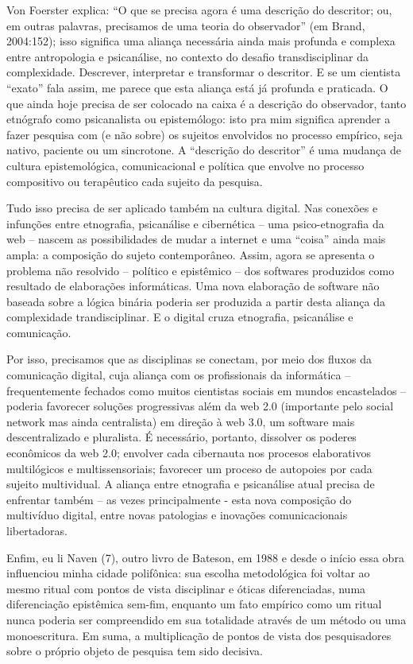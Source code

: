 \documentclass[a4paper, 12pt]{article} %
\begin{document}
Von Foerster explica: “O que se precisa agora é uma descrição do descritor; ou, em outras palavras, precisamos de uma teoria do observador” (em Brand, 2004:152); isso significa uma aliança necessária ainda mais profunda e complexa entre antropologia e psicanálise, no contexto do desafio  transdisciplinar da complexidade. Descrever, interpretar e transformar o descritor. E se um cientista “exato” fala assim, me parece que esta aliança está já profunda e praticada. O que ainda hoje precisa de ser colocado na caixa é a descrição do observador, tanto etnógrafo como psicanalista ou epistemólogo: isto pra mim significa aprender a fazer pesquisa com (e não sobre) os sujeitos envolvidos no processo empírico, seja nativo, paciente ou um sincrotone. A “descrição do descritor” é uma mudança de cultura epistemológica, comunicacional e política que envolve no processo compositivo ou terapêutico cada sujeito da pesquisa. 

Tudo isso precisa de ser aplicado também na cultura digital.  Nas conexões  e infunções entre etnografia, psicanálise e cibernética – uma psico-etnografia da web – nascem as possibilidades de mudar a internet e uma “coisa” ainda mais ampla: a composição do sujeto contemporâneo. Assim, agora se apresenta o problema não resolvido – político e epistêmico – dos softwares produzidos como resultado de elaborações informáticas. Uma nova elaboração de software não baseada sobre a lógica binária poderia ser produzida a partir desta aliança da complexidade trandisciplinar. E o digital cruza etnografia, psicanálise e comunicação.

Por isso, precisamos que as disciplinas se conectam, por meio dos fluxos da comunicação digital, cuja aliança com os profissionais da informática – frequentemente fechados como muitos cientistas sociais em mundos encastelados – poderia favorecer soluções progressivas além da web 2.0 (importante pelo social network mas ainda centralista) em direção à web 3.0, um software  mais descentralizado e pluralista. É necessário, portanto, dissolver os poderes econômicos da web 2.0; envolver cada cibernauta nos procesos elaborativos multilógicos e multissensoriais; favorecer um proceso de autopoies por cada sujeito multividual. A aliança entre etnografia e psicanálise atual precisa de enfrentar também – as vezes principalmente  - esta nova composição do multivíduo digital, entre novas patologias e inovações comunicacionais libertadoras.

Enfim, eu li Naven (7), outro livro de Bateson, em 1988 e desde o início essa obra influenciou minha cidade polifônica: sua escolha metodológica foi voltar ao mesmo ritual com pontos de vista disciplinar e óticas diferenciadas, numa diferenciação epistêmica sem-fim, enquanto um fato empírico como um ritual nunca poderia ser compreendido em sua totalidade através de um método ou uma monoescritura. Em suma, a multiplicação de pontos de vista dos pesquisadores sobre o próprio objeto de pesquisa tem sido decisiva. 
\end{document}
